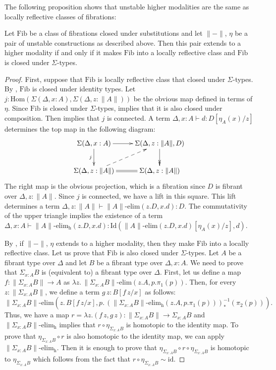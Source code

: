 \documentclass[reqno]{mscs}
\newcommand{\fs}[1]{\mathrm{#1}}
\newcommand{\Hom}{\fs{Hom}}
\newcommand{\Id}{\fs{Id}}
\newcommand{\sym}[1]{#1^{-1}}
\newcommand{\id}{\fs{id}}
\newcommand{\Fib}{\fs{Fib}}
\numberwithin{figure}{section}
\begin{document}
The following proposition shows that unstable higher modalities are the same as locally reflective classes of fibrations:

\begin{prop}
Let $\Fib$ be a class of fibrations closed under substitutions and let $\| - \|$, $\eta$ be a pair of unstable constructions as described above.
Then this pair extends to a higher modality if and only if it makes $\Fib$ into a locally reflective class and $\Fib$ is closed under $\Sigma$-types.
\end{prop}
\begin{proof}
First, suppose that $\Fib$ is locally reflective class that closed under $\Sigma$-types.
By , $\Fib$ is closed under identity types.
Let $j : \Hom(\Sigma(\Delta, x : A), \Sigma(\Delta, z : \| A \|))$ be the obvious map defined in terms of $\eta$.
Since $\Fib$ is closed under $\Sigma$-types,  implies that it is also closed under composition.
Then  implies that $j$ is connected.
A term $\Delta, x : A \vdash d : D[\eta_A(x)/z]$ determines the top map in the following diagram:
\[ \xymatrix{ \Sigma(\Delta, x : A) \ar[r] \ar[d]_j                  & \Sigma(\Delta, z : \| A \|, D) \ar@{->>}[d] \\
              \Sigma(\Delta, z : \| A \|) \ar@{-->}[ur] \ar@{=}[r]  & \Sigma(\Delta, z : \| A \|)
            } \]
The right map is the obvious projection, which is a fibration since $D$ is fibrant over $\Delta, z : \| A \|$.
Since $j$ is connected, we have a lift in this square.
This lift determines a term $\Delta, z : \| A \| \vdash \| A \|\text{-}\fs{elim}(z.D, x.d) : D$.
The commutativity of the upper triangle implies the existence of a term $\Delta, x : A \vdash \| A \|\text{-}\fs{elim_h}(z.D, x.d) : \Id(\| A \|\text{-}\fs{elim}(z.D, x.d)[\eta_A(x)/z],d)$.

By , if $\| - \|$, $\eta$ extends to a higher modality, then they make $\Fib$ into a locally reflective class.
Let us prove that $\Fib$ is also closed under $\Sigma$-types.
Let $A$ be a fibrant type over $\Delta$ and let $B$ be a fibrant type over $\Delta, x : A$.
We need to prove that $\Sigma_{x : A} B$ is (equivalent to) a fibrant type over $\Delta$.
First, let us define a map $f : \| \Sigma_{x : A} B \| \to A$ as $\lambda z.\,\| \Sigma_{x : A} B \|\text{-}\fs{elim}(z.A,p.\pi_1(p))$.
Then, for every $z : \| \Sigma_{x : A} B \|$, we define a term $g\,z : B[f\,z/x]$ as follows:
\[ \| \Sigma_{x : A} B \|\text{-}\fs{elim}(z.\,B[f\,z/x], p.\,\sym{(\| \Sigma_{x : A} B\|\text{-}\fs{elim_h}(z.A,p.\pi_1(p)))}_*(\pi_2(p))). \]
Thus, we have a map $r = \lambda z.(f\,z,g\,z) : \| \Sigma_{x : A} B \| \to \Sigma_{x : A} B$ and $\| \Sigma_{x : A} B\|\text{-}\fs{elim_h}$ implies that $r \circ \eta_{\Sigma_{x : A} B}$ is homotopic to the identity map.
To prove that $\eta_{\Sigma_{x : A} B} \circ r$ is also homotopic to the identity map, we can apply $\| \Sigma_{x : A} B\|\text{-}\fs{elim_h}$.
Then it is enough to prove that $\eta_{\Sigma_{x : A} B} \circ r \circ \eta_{\Sigma_{x : A} B}$ is homotopic to $\eta_{\Sigma_{x : A} B}$ which follows from the fact that $r \circ \eta_{\Sigma_{x : A} B} \sim \id$.
\end{proof}
\end{document}
